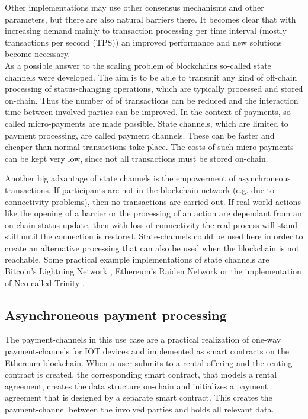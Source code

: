 \documentclass[conference]{IEEEtran}
\begin{document}
Other implementations may use other consensus mechanisms and other parameters, but there are also natural barriers there. It becomes clear that with increasing demand mainly to transaction processing per time interval (mostly transactions per second (TPS)) an improved performance and new solutions become necessary. \cite{Macdonald2017}\\
As a possible answer to the scaling problem of blockchains so-called state channels were developed. The aim is to be able to transmit any kind of off-chain processing of status-changing operations, which are typically processed and stored on-chain. Thus the number of of transactions can be reduced and the interaction time between involved parties can be improved. In the context of payments, so-called micro-payments are made possible. State channels, which are limited to payment processing, are called payment channels. These can be faster and cheaper than normal transactions take place. The costs of such micro-payments can be kept very low, since not all transactions must be stored on-chain. \cite{Coleman2018}

Another big advantage of state channels is the empowerment of asynchroneous transactions. If participants are not in the blockchain network (e.g. due to connectivity problems), then no transactions are carried out. If real-world actions like the opening of a barrier or the processing of an action are dependant from an on-chain status update, then with loss of connectivity the real process will stand still until the connection is restored. State-channels could be used here in order to create an alternative processing that can also be used when the blockchain is not reachable. Some practical example implementations of state channels are Bitcoin's Lightning Network \cite{Lightning2016}, Ethereum's Raiden Network or the implementation of Neo called Trinity \cite{Trinity2018}.


\subsection{Asynchroneous payment processing}
The payment-channels in this use case are a practical realization of one-way payment-channels for IOT devices and implemented as smart contracts on the Ethereum blockchain. When a user submits to a rental offering and the renting contract is created, the corresponding smart contract, that models a rental agreement, creates the data structure on-chain and initializes a payment agreement that is designed by a separate smart contract. This creates the payment-channel between the involved parties and holds all relevant data.
\end{document}
